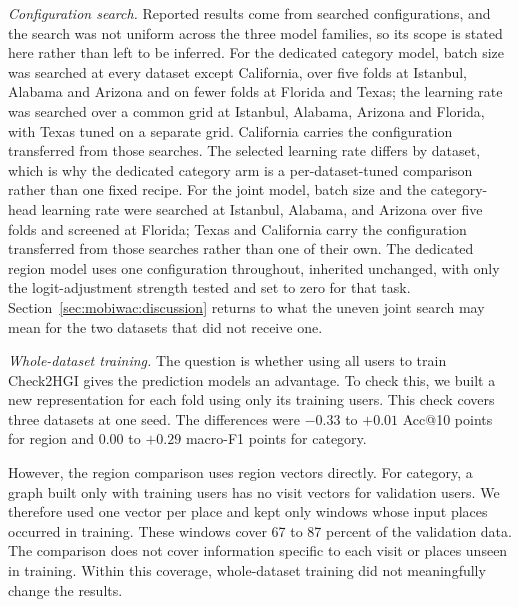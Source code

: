 \emph{Configuration search.} Reported results come from searched configurations, and the search
was not uniform across the three model families, so its scope is stated here rather than left to
be inferred. %
For the dedicated category model, batch size was searched at every dataset except California, over
five folds at Istanbul, Alabama and Arizona and on fewer folds at Florida and Texas; the learning
rate was searched over a common grid at Istanbul, Alabama, Arizona and Florida, with Texas tuned on
a separate grid. California carries the configuration transferred from those searches.
The selected learning rate differs by dataset, which is
why the dedicated category arm is a per-dataset-tuned comparison rather than one fixed recipe. For
the joint model, batch size and the category-head learning rate were searched at Istanbul, Alabama,
and Arizona over five folds and screened at Florida; Texas and California carry the configuration
transferred from those searches rather than one of their own. The dedicated region model uses one
configuration throughout, inherited unchanged, with only the logit-adjustment strength tested and
set to zero for that task. Section~\ref{sec:mobiwac:discussion} returns to what the uneven joint
search may mean for the two datasets that did not receive one.

\emph{Whole-dataset training.} The question is whether using all users to train
Check2HGI gives the prediction models an advantage. To check this, we built a new
representation for each fold using only its training users. This check covers three datasets at
one seed.
The differences were $-0.33$ to $+0.01$ Acc@10 points for region and $0.00$ to
$+0.29$ macro-F1 points for category.

However, the region comparison uses region vectors directly. For category, a graph built only
with training users has no visit vectors for validation users. We therefore used one
vector per place and kept only windows whose input places occurred in training. These
windows cover 67 to 87 percent of the validation data. The comparison does not cover
information specific to each visit or places unseen in training. Within this
coverage, whole-dataset training did not meaningfully change the results.

